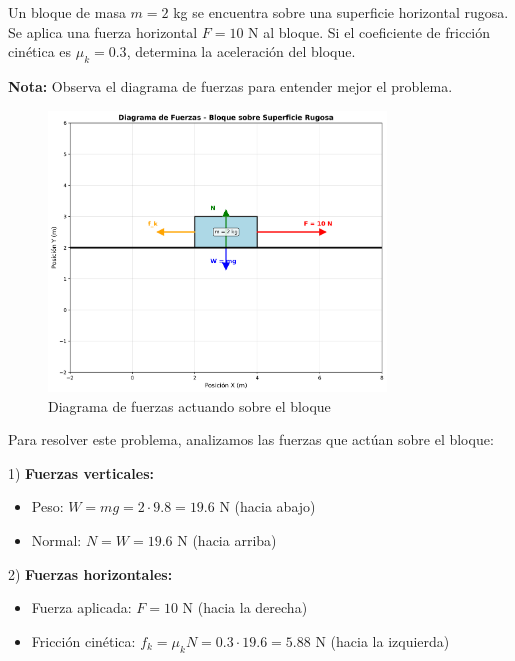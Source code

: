 \begin{ejercicio}[
  id=FIS_MOV_001,
  materia=fisica,
  capitulo=movimiento,
  nivel=intermedio,
  procedencia="Examen CEPRE 2023",
  visibilidad=true,
  libros={fisica_basica, fisica_mecanica},
  youtube_url="https://www.youtube.com/watch?v=ejemplo_fisica",
  mostrar_solucion=true,
  libro_promocion=""
]
Un bloque de masa $m = 2$ kg se encuentra sobre una superficie horizontal rugosa. Se aplica una fuerza horizontal $F = 10$ N al bloque. Si el coeficiente de fricción cinética es $\mu_k = 0.3$, determina la aceleración del bloque.

\textbf{Nota:} Observa el diagrama de fuerzas para entender mejor el problema.

\begin{figure}[h]
\centering
\includegraphics[width=0.8\textwidth]{imagenes/diagrama_fuerzas_001.png}
\caption{Diagrama de fuerzas actuando sobre el bloque}
\label{fig:diagrama_fuerzas}
\end{figure}

\begin{solucion}
Para resolver este problema, analizamos las fuerzas que actúan sobre el bloque:

1) \textbf{Fuerzas verticales:}
   \begin{itemize}
   \item Peso: $W = mg = 2 \cdot 9.8 = 19.6$ N (hacia abajo)
   \item Normal: $N = W = 19.6$ N (hacia arriba)
   \end{itemize}

2) \textbf{Fuerzas horizontales:}
   \begin{itemize}
   \item Fuerza aplicada: $F = 10$ N (hacia la derecha)
   \item Fricción cinética: $f_k = \mu_k N = 0.3 \cdot 19.6 = 5.88$ N (hacia la izquierda)
   \end{itemize}


\end{solucion}
\end{ejercicio}
